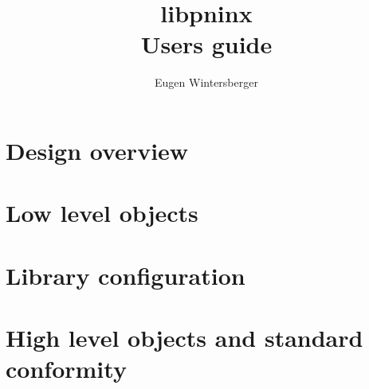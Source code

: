 \documentclass[a4paper,twoside]{book}
\author{Eugen Wintersberger}
\title{{\Huge libpninx\\ Users guide}}
\begin{document}
\maketitle
\tableofcontents

\chapter{Design overview}


\chapter{Low level objects}


\chapter{Library configuration}

\chapter{High level objects and standard conformity}
\end{document}
